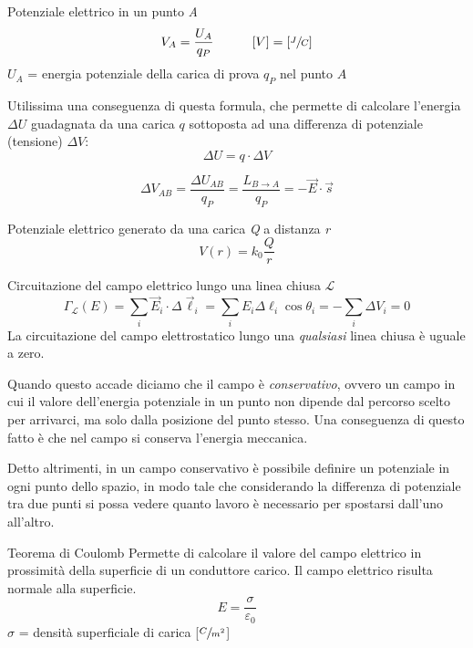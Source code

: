 \documentclass[a4paper,11pt,italian]{article}
\begin{document}
\begin{description}
\begin{soloscientifico}
  \item[Potenziale elettrico in un punto \textit{A}]
  \[ V_A = \frac{U_A}{q_P} \hspace*{3em} [V] =  \left[ \sfrac{J}{C} \right] \]
  $ U_A $ = energia potenziale della carica di prova $ q_P $ nel punto $ A $
  
  Utilissima una conseguenza di questa formula, che permette di calcolare l'energia $ \Delta U $ guadagnata da una carica $ q $ sottoposta ad una differenza di potenziale (tensione) $ \Delta V $:
  \[ \Delta U = q \cdot \Delta V \]
\end{soloscientifico}   %

  \item[Differenza di potenziale (tensione) tra i punti \textit{A} e \textit{B}]
  \[  \Delta V_{AB} = \frac{\Delta U_{AB}}{q_P} = \frac{L_{B \rightarrow A}}{q_P} = - \vec{E} \cdot \vec{s} \]

\begin{soloscientifico} %
  \item[Potenziale elettrico generato da una carica \textit{Q} a distanza \textit{r}]
  \[ V(r) = k_0 \frac{Q}{r}  \]
  
  \item[Circuitazione del campo elettrico lungo una linea chiusa  $ \mathscr{L} $]\label{conc:circuitazioneE}
  \[ \Gamma_\mathscr{L}(E) = \sum_i  \vec{E}_i \cdot \Delta\vec{\ell}_i = \sum_i E_i \Delta \ell_i \cos \theta_i = - \sum_i \Delta V_i = 0 \]
  La circuitazione del campo elettrostatico lungo una \emph{qualsiasi} linea chiusa è uguale a zero.
  
  Quando questo accade diciamo che il campo è \emph{conservativo}, ovvero un campo in cui il valore dell'energia potenziale in un punto non dipende dal percorso scelto per arrivarci, ma solo dalla posizione del punto stesso. Una conseguenza di questo fatto è che nel campo si conserva l'energia meccanica.
  
  Detto altrimenti, in un campo conservativo è possibile definire un potenziale in ogni punto dello spazio, in modo tale che considerando la differenza di potenziale tra due punti si possa vedere quanto lavoro è necessario per spostarsi dall'uno all'altro. 
  
  \item[Teorema di Coulomb] 
  Permette di calcolare il valore del campo elettrico in prossimità della superficie di un conduttore carico. Il campo elettrico risulta normale alla superficie.
  \[ E = \frac{\sigma}{\varepsilon_0} \]
  $ \sigma $ = densità superficiale di carica [$ \sfrac{C}{m^2} $]
\end{soloscientifico}   %
  

\end{description}
\end{document}
